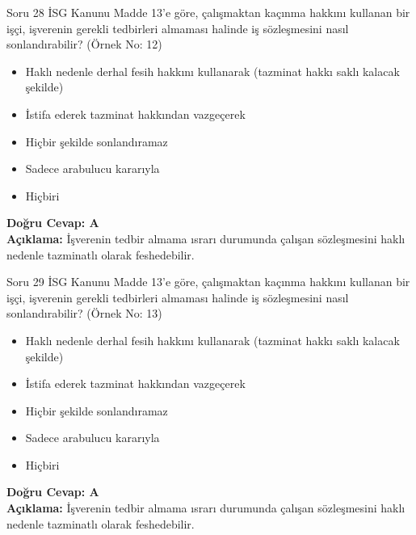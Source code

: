 \documentclass[12pt,a4paper]{article}
\begin{document}
\begin{testcard}{Soru 28}
    İSG Kanunu Madde 13'e göre, çalışmaktan kaçınma hakkını kullanan bir işçi, işverenin gerekli tedbirleri almaması halinde iş sözleşmesini nasıl sonlandırabilir? (Örnek No: 12)
    \begin{itemize}
        \item[A)] Haklı nedenle derhal fesih hakkını kullanarak (tazminat hakkı saklı kalacak şekilde)
        \item[B)] İstifa ederek tazminat hakkından vazgeçerek
        \item[C)] Hiçbir şekilde sonlandıramaz
        \item[D)] Sadece arabulucu kararıyla
        \item[E)] Hiçbiri
    \end{itemize}
    \tcblower
    \textbf{Doğru Cevap: A} \\
    \textbf{Açıklama:} İşverenin tedbir almama ısrarı durumunda çalışan sözleşmesini haklı nedenle tazminatlı olarak feshedebilir.
\end{testcard}

\begin{testcard}{Soru 29}
    İSG Kanunu Madde 13'e göre, çalışmaktan kaçınma hakkını kullanan bir işçi, işverenin gerekli tedbirleri almaması halinde iş sözleşmesini nasıl sonlandırabilir? (Örnek No: 13)
    \begin{itemize}
        \item[A)] Haklı nedenle derhal fesih hakkını kullanarak (tazminat hakkı saklı kalacak şekilde)
        \item[B)] İstifa ederek tazminat hakkından vazgeçerek
        \item[C)] Hiçbir şekilde sonlandıramaz
        \item[D)] Sadece arabulucu kararıyla
        \item[E)] Hiçbiri
    \end{itemize}
    \tcblower
    \textbf{Doğru Cevap: A} \\
    \textbf{Açıklama:} İşverenin tedbir almama ısrarı durumunda çalışan sözleşmesini haklı nedenle tazminatlı olarak feshedebilir.
\end{testcard}
\end{document}
